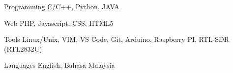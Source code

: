 

\begin{cvskills}

  \cvskill
    {Programming} %
    {C/C++, Python, JAVA} %

  \cvskill
    {Web} %
    {PHP, Javascript, CSS, HTML5} %

  \cvskill
    {Tools} %
    {Linux/Unix, VIM, VS Code, Git, Arduino, Raspberry PI, RTL-SDR (RTL2832U)} %

  \cvskill
    {Languages} %
    {English, Bahasa Malaysia} %

\end{cvskills}
